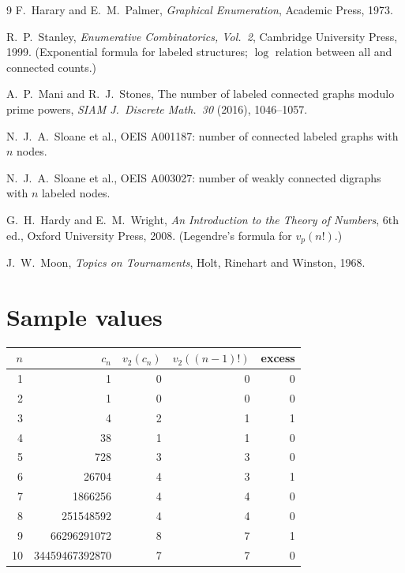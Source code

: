 \documentclass[11pt]{article}
\theoremstyle{definition}
\begin{document}
\begin{thebibliography}{9}
F.~Harary and E.~M.~Palmer, \textit{Graphical Enumeration}, Academic Press, 1973.

R.~P.~Stanley, \textit{Enumerative Combinatorics, Vol.~2}, Cambridge University Press, 1999.
(Exponential formula for labeled structures; $\log$ relation between all and connected counts.)

A.~P.~Mani and R.~J.~Stones, The number of labeled connected graphs modulo prime powers,
\textit{SIAM J.\ Discrete Math.\ 30} (2016), 1046--1057.

N.~J.~A.~Sloane et al., OEIS A001187: number of connected labeled graphs with $n$ nodes.

N.~J.~A.~Sloane et al., OEIS A003027: number of weakly connected digraphs with $n$ labeled nodes.

G.~H.~Hardy and E.~M.~Wright, \textit{An Introduction to the Theory of Numbers}, 6th ed.,
Oxford University Press, 2008. (Legendre's formula for $v_p(n!)$.)

J.~W.~Moon, \textit{Topics on Tournaments}, Holt, Rinehart and Winston, 1968.
\end{thebibliography}

\appendix
\section{Sample values}
\begin{center}
\begin{tabular}{r|rrrr}
\toprule
$n$ & $c_n$ & $v_2(c_n)$ & $v_2((n-1)!)$ & excess \\
\midrule
1 & 1 & 0 & 0 & 0 \\
2 & 1 & 0 & 0 & 0 \\
3 & 4 & 2 & 1 & 1 \\
4 & 38 & 1 & 1 & 0 \\
5 & 728 & 3 & 3 & 0 \\
6 & 26704 & 4 & 3 & 1 \\
7 & 1866256 & 4 & 4 & 0 \\
8 & 251548592 & 4 & 4 & 0 \\
9 & 66296291072 & 8 & 7 & 1 \\
10 & 34459467392870 & 7 & 7 & 0 \\
\bottomrule
\end{tabular}
\end{center}
\end{document}
